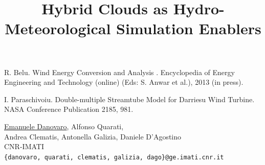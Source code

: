 \documentclass[article, A4, 11pt]{llncs}%
\begin{document}

\begin{thebibliography}{10}
{\sc R. Belu}. {Wind Energy Conversion and Analysis }. Encyclopedia of Energy Engineering and Technology (online) (Eds: S. Anwar et al.), 2013 (in press).

{\sc I. Paraschivoiu}. {Double-multiple Streamtube Model for Darriesu Wind Turbine}. NASA Conference Publication 2185, 981.
\end{thebibliography} %



\title{Hybrid Clouds as Hydro-Meteorological Simulation Enablers}
 \author{} \institute{}
\maketitle
\vspace*{-2mm}
\begin{center}
{\large \underline{Emanuele Danovaro}, Alfonso Quarati,\\Andrea Clematis, Antonella Galizia, Daniele D'Agostino}\\
CNR-IMATI\\
{\tt \{danovaro, quarati, clematis, galizia, dago\}@ge.imati.cnr.it}
\end{center}
\end{document}
